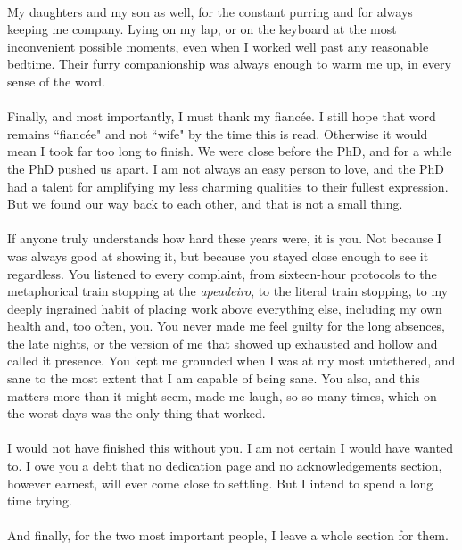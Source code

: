 \\
My daughters and my son as well, for the constant purring and for always keeping me company. Lying on my lap, or on the keyboard at the most inconvenient possible moments, even when I worked well past any reasonable bedtime. Their furry companionship was always enough to warm me up, in every sense of the word.
\\
\\
Finally, and most importantly, I must thank my fiancée. I still hope that word remains “fiancée" and not “wife" by the time this is read. Otherwise it would mean I took far too long to finish. We were close before the PhD, and for a while the PhD pushed us apart. I am not always an easy person to love, and the PhD had a talent for amplifying my less charming qualities to their fullest expression. But we found our way back to each other, and that is not a small thing.
\\
\\
If anyone truly understands how hard these years were, it is you. Not because I was always good at showing it, but because you stayed close enough to see it regardless. You listened to every complaint, from sixteen-hour protocols to the metaphorical train stopping at the \textit{apeadeiro}, to the literal train stopping, to my deeply ingrained habit of placing work above everything else, including my own health and, too often, you. You never made me feel guilty for the long absences, the late nights, or the version of me that showed up exhausted and hollow and called it presence. You kept me grounded when I was at my most untethered, and sane to the most extent that I am capable of being sane. You also, and this matters more than it might seem, made me laugh, so so many times, which on the worst days was the only thing that worked.
\\
\\
I would not have finished this without you. I am not certain I would have wanted to. I owe you a debt that no dedication page and no acknowledgements section, however earnest, will ever come close to settling. But I intend to spend a long time trying.
\\
\\
And finally, for the two most important people, I leave a whole section for them.